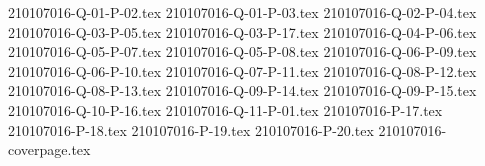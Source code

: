 \documentclass{article}                              %
\begin{document}
{210107016-Q-01-P-02.tex}
{210107016-Q-01-P-03.tex}
{210107016-Q-02-P-04.tex}
{210107016-Q-03-P-05.tex}
{210107016-Q-03-P-17.tex}
{210107016-Q-04-P-06.tex}
{210107016-Q-05-P-07.tex}
{210107016-Q-05-P-08.tex}
{210107016-Q-06-P-09.tex}
{210107016-Q-06-P-10.tex}
{210107016-Q-07-P-11.tex}
{210107016-Q-08-P-12.tex}
{210107016-Q-08-P-13.tex}
{210107016-Q-09-P-14.tex}
{210107016-Q-09-P-15.tex}
{210107016-Q-10-P-16.tex}
{210107016-Q-11-P-01.tex}
{210107016-P-17.tex}
{210107016-P-18.tex}
{210107016-P-19.tex}
{210107016-P-20.tex}
{210107016-coverpage.tex}
\end{document}
